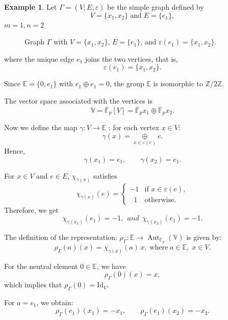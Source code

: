 \documentclass[preprint,12pt,authoryear]{elsarticle}
\theoremstyle{definition}
\newtheorem{examp}{Example}
\DeclareMathOperator{\Aut}{Aut}
\begin{document}
\medskip
\begin{examp}
Let $\Gamma=(V;E,\varepsilon)$ be the simple graph defined by
\[
V=\{x_1,x_2\}\; \textrm{and}\; 
E=\{e_1\},
\]
$m=1, n=2$\\
\begin{figure}[h]
\centering
{}
\caption{\footnotesize Graph $\Gamma$ with $V=\{x_1,x_2\}$, $E=\{e_1\}$, and $\varepsilon(e_1)=\{x_1,x_2\}$.}
\label{fig:gamma}
\end{figure}

where the unique edge $e_1$ joins the two vertices, that is,
\[
\varepsilon(e_1)=\{x_1,x_2\}.
\]


Since $\mathbb{E}=\{0,e_1\}$ with $e_1\oplus e_1=0$, the group $\mathbb{E}$ is isomorphic to
$\mathbb{Z}/2\mathbb{Z}$.

\medskip
The vector space associated with the vertices is
\[
\mathbb{V}=\overline{\mathbb{F}}_{p}[V]= \overline{\mathbb{F}}_{p}x_1 \oplus \overline{\mathbb{F}}_{p} x_2.
\]

Now we define the map $\gamma : V \to \mathbb{E}$ : for each vertex $x\in V$:
\[
\gamma(x)=\underset{x \in\varepsilon(e)}{\oplus} e.
\]
Hence,
\[
\gamma(x_1)=e_1, \qquad \gamma(x_2)=e_1.
\]

  For $x\in V$ and $e\in E$, $\chi_{\gamma(x)}$ satisfies
\[
\chi_{\gamma(x)}(e)=
\begin{cases}
-1 & \text{if } x\in\varepsilon(e),\\
\;\;1 & \text{otherwise}.
\end{cases}
\]
Therefore, we get
\[
\chi_{\gamma(x_1)}(e_1)=-1, ~~ and ~~
\chi_{\gamma(x_2)}(e_1)=-1.
\]

\noindent The definition of the representation:  $\rho_\Gamma: \mathbb{E}\to\Aut_{\mathbb{F}_{p}}(\mathbb{V})$ is given by:
\[
\rho_\Gamma(a)(x)=\chi_{\gamma(x)}(a)\,x,\; \textrm{where}\; 
 a\in \mathbb{E},\; x\in V.
\]

\noindent For the neutral element $0\in  \mathbb{E}$, we have
\[
\rho_\Gamma(0)(x)=x,
\]
which implies that $\rho_\Gamma(0)=\mathrm{Id}_V$.

\noindent For $a=e_1$, we obtain:
\[
\rho_\Gamma(e_1)(x_1)=-x_1, 
\qquad
\rho_\Gamma(e_1)(x_2)=-x_2.
\]
\end{examp}
\end{document}
